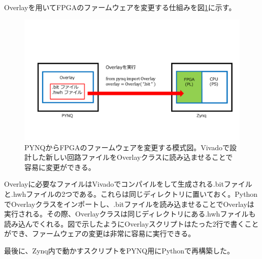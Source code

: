 


Overlayを用いてFPGAのファームウェアを変更する仕組みを図\ref{overlay}に示す。

\begin{figure}[htbp]
  \centering
  \includegraphics[width=1.0\columnwidth]{4_elDAQ/figs/overlay3.pdf}
  \caption{PYNQからFPGAのファームウェアを変更する模式図。Vivadoで設計した新しい回路ファイルをOverlayクラスに読み込ませることで容易に変更ができる。}
  \label{overlay}
\end{figure}
Overlayに必要なファイルはVivadoでコンパイルをして生成される.bitファイルと.hwhファイルの2つである。これらは同じディレクトリに置いておく。PythonでOverlayクラスをインポートし、.bitファイルを読み込ませることでOverlayは実行される。その際、Overlayクラスは同じディレクトリにある.hwhファイルも読み込んでくれる。図で示したようにOverlayスクリプトはたった2行で書くことができ、ファームウェアの変更は非常に容易に実行できる。

最後に、Zynq内で動かすスクリプトをPYNQ用にPythonで再構築した。

